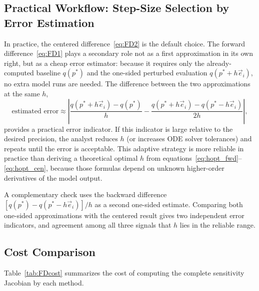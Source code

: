 \subsection{Practical Workflow: Step-Size Selection by Error Estimation}

In practice, the centered difference~\eqref{eq:FD2} is the
default choice. The forward difference~\eqref{eq:FD1} plays a
secondary role not as a first approximation in its own right,
but as a cheap error estimator: because it requires only the
already-computed baseline $q(p^*)$ and the one-sided perturbed
evaluation $q(p^*+h\vec{e}_i)$, no extra model runs are needed.
The difference between the two approximations at the same $h$,
\begin{equation}
  \text{estimated error} \approx
  \left|
    \frac{q(p^*+h\vec{e}_i) - q(p^*)}{h}
    -
    \frac{q(p^*+h\vec{e}_i) - q(p^*-h\vec{e}_i)}{2h}
  \right|,
  \label{eq:FDerror}
\end{equation}
provides a practical error indicator. If this indicator is large
relative to the desired precision, the analyst reduces $h$ (or
increases ODE solver tolerances) and repeats until the error is
acceptable. This adaptive strategy is more reliable in practice
than deriving a theoretical optimal $h$ from
equations~\eqref{eq:hopt_fwd}--\eqref{eq:hopt_cen}, because
those formulas depend on unknown higher-order derivatives of the
model output.

A complementary check uses the backward difference
$[q(p^*) - q(p^*-h\vec{e}_i)]/h$ as a second one-sided estimate.
Comparing both one-sided approximations with the centered result
gives two independent error indicators, and agreement among all
three signals that $h$ lies in the reliable range.

\subsection{Cost Comparison}

Table~\ref{tab:FDcost} summarizes the cost of computing the
complete sensitivity Jacobian by each method.

